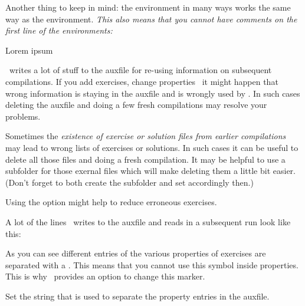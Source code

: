 \documentclass{xsim-manual}
\begin{document}
Another thing to keep in mind: the environment in many ways works the same way
as the  environment. \emph{This also means that you
  \emph{cannot} have comments on the first line of the environments:}
\begin{sourcecode}
  \begin{exercise}[points=2] %
    Lorem ipsum
  \end{exercise}
\end{sourcecode}

\begin{bewareofthedog}
  \xsim\ writes a lot of stuff to the auxfile for re-using information on
  subsequent compilations.  If you add exercises, change properties \etc\ it
  might happen that wrong information is staying in the auxfile and is wrongly
  used by \xsim.  In such cases deleting the auxfile and doing a few fresh
  compilations may resolve your problems.

  Sometimes the \emph{existence of exercise or solution files from earlier
    compilations} may lead to wrong lists of exercises or solutions.  In such
  cases it can be useful to delete all those files and doing a fresh
  compilation.  It may be helpful to use a subfolder for those exernal files
  which will make deleting them a little bit easier. (Don't forget to both
  create the subfolder and set  accordingly then.)

  Using the  option might help to reduce erroneous exercises.
\end{bewareofthedog}

\begin{bewareofthedog}
  A lot of the lines \xsim\ writes to the auxfile and reads in a subsequent
  run look like this:
\begin{sourcecode}
\end{sourcecode}
  As you can see different entries of the various properties of exercises are
  separated with a \code{|}.  This means that you cannot use this symbol
  inside properties.  This is why \xsim\ provides an option to change this
  marker.
\end{bewareofthedog}
\begin{options}
  \Default{\code{|}}
    Set the string that is used to separate the property
    entries in the auxfile.
\end{options}
\end{document}
